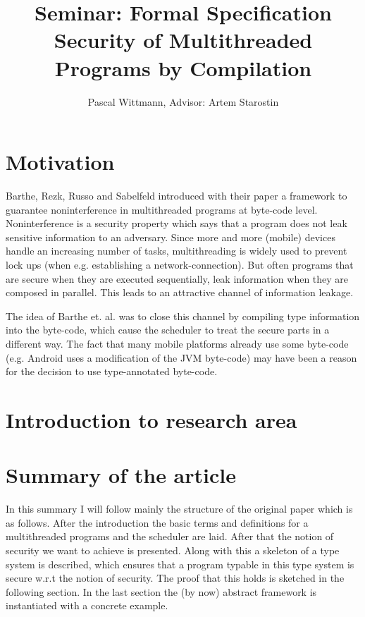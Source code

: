 \documentclass[a4paper,10pt]{llncs}
\begin{document}
\title{{\normalsize Seminar: Formal Specification} \\[1ex]
  Security of Multithreaded Programs by Compilation\cite{Barthe07}}
\author{Pascal Wittmann, Advisor: Artem Starostin}

\maketitle


\section{Motivation}
\label{sec:motivation}
Barthe, Rezk, Russo and Sabelfeld introduced with
their paper \cite{Barthe07} a framework to guarantee
noninterference in multithreaded programs at byte-code
level. Noninterference is a security property which
says that a program does not leak sensitive information
to an adversary. Since more and more (mobile) devices handle
an increasing number of tasks, multithreading is widely used
to prevent lock ups (when e.g. establishing a
network-connection). But often programs that are secure when they
are executed sequentially, leak information when they are
composed in parallel. This leads to an attractive channel of
information leakage.

The idea of Barthe et. al. was to close this channel by compiling
type information into the byte-code, which cause the scheduler to
treat the secure parts in a different way. The fact that many mobile
platforms already use some byte-code (e.g. Android uses a modification
of the JVM byte-code) may have been a reason for the decision to use
type-annotated byte-code.

\section{Introduction to research area}
\label{sec:introduction}
\section{Summary of the article}
\label{sec:discussion}
In this summary I will follow mainly the structure of the original
paper\cite{Barthe07} which is as follows. After the introduction the basic
terms and definitions for a multithreaded programs and the scheduler are
laid. After that the notion of security we want to achieve is presented.
Along with this a skeleton of a type system is described, which ensures
that a program typable in this type system is secure w.r.t the notion of
security. The proof that this holds is sketched in the following section.
In the last section the (by now) abstract framework is instantiated with a
concrete example.
\end{document}
